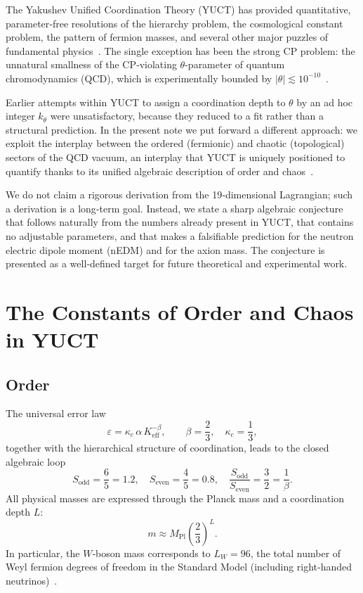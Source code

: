 \documentclass[12pt,a4paper]{article}
\begin{document}
	The Yakushev Unified Coordination Theory (YUCT) has provided quantitative, parameter‑free resolutions of the hierarchy problem, the cosmological constant problem, the pattern of fermion masses, and several other major puzzles of fundamental physics~\cite{Y1,Y3,Y4}. The single exception has been the strong CP problem: the unnatural smallness of the CP‑violating \(\theta\)-parameter of quantum chromodynamics (QCD), which is experimentally bounded by \(|\theta| \lesssim 10^{-10}\)~\cite{nEDM2020}.
	
	Earlier attempts within YUCT to assign a coordination depth to \(\theta\) by an ad hoc integer \(k_\theta\) were unsatisfactory, because they reduced to a fit rather than a structural prediction. In the present note we put forward a different approach: we exploit the interplay between the ordered (fermionic) and chaotic (topological) sectors of the QCD vacuum, an interplay that YUCT is uniquely positioned to quantify thanks to its unified algebraic description of order and chaos~\cite{Y2,Feig}.
	
	We do not claim a rigorous derivation from the 19‑dimensional Lagrangian; such a derivation is a long‑term goal. Instead, we state a sharp algebraic conjecture that follows naturally from the numbers already present in YUCT, that contains no adjustable parameters, and that makes a falsifiable prediction for the neutron electric dipole moment (nEDM) and for the axion mass. The conjecture is presented as a well‑defined target for future theoretical and experimental work.
	
	\section{The Constants of Order and Chaos in YUCT}
	\label{sec:oc}
	
	\subsection{Order}
	The universal error law
	\[
	\varepsilon = \kappa_c\,\alpha\,K_{\mathrm{eff}}^{-\beta},\qquad \beta = \frac{2}{3},\quad \kappa_c = \frac{1}{3},
	\]
	together with the hierarchical structure of coordination, leads to the closed algebraic loop
	\[
	S_{\mathrm{odd}} = \frac{6}{5} = 1.2,\quad S_{\mathrm{even}} = \frac{4}{5} = 0.8,\quad 
	\frac{S_{\mathrm{odd}}}{S_{\mathrm{even}}} = \frac{3}{2} = \frac{1}{\beta}.
	\]
	All physical masses are expressed through the Planck mass and a coordination depth \(L\):
	\[
	m \approx M_{\mathrm{Pl}}\left(\frac{2}{3}\right)^L.
	\]
	In particular, the \(W\)‑boson mass corresponds to \(L_W = 96\), the total number of Weyl fermion degrees of freedom in the Standard Model (including right‑handed neutrinos)~\cite{Y3}.
	
\end{document}
